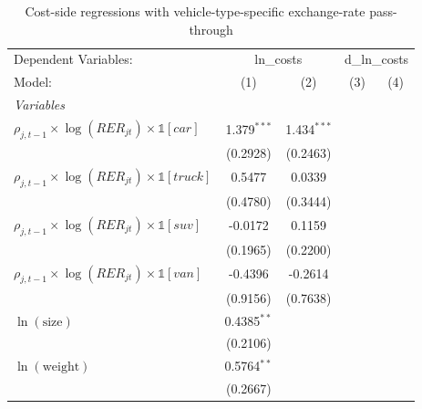 
\begin{table}[htbp]
   \caption{\label{tab:cost_reg_vehicle_type} Cost-side regressions with vehicle-type-specific exchange-rate pass-through}
   \centering
   \begin{tabular}{lcccc}
      \tabularnewline \midrule \midrule
      Dependent Variables: & \multicolumn{2}{c}{ln\_costs} & \multicolumn{2}{c}{d\_ln\_costs}\\
      Model:                                                                  & (1)           & (2)           & (3)          & (4)\\
      \midrule
      \emph{Variables}\\
      $\rho_{j,t-1}\times\log(RER_{jt}) \times \mathbb{1}[car]$               & 1.379$^{***}$ & 1.434$^{***}$ &              &   \\
                                                                              & (0.2928)      & (0.2463)      &              &   \\
      $\rho_{j,t-1}\times\log(RER_{jt}) \times \mathbb{1}[truck]$             & 0.5477        & 0.0339        &              &   \\
                                                                              & (0.4780)      & (0.3444)      &              &   \\
      $\rho_{j,t-1}\times\log(RER_{jt}) \times \mathbb{1}[suv]$               & -0.0172       & 0.1159        &              &   \\
                                                                              & (0.1965)      & (0.2200)      &              &   \\
      $\rho_{j,t-1}\times\log(RER_{jt}) \times \mathbb{1}[van]$               & -0.4396       & -0.2614       &              &   \\
                                                                              & (0.9156)      & (0.7638)      &              &   \\
      $\ln(\text{size})$                                                      & 0.4385$^{**}$ &               &              &   \\
                                                                              & (0.2106)      &               &              &   \\
      $\ln(\text{weight})$                                                    & 0.5764$^{**}$ &               &              &   \\
                                                                              & (0.2667)      &               &              &   \\

\end{tabular}
\end{table}
